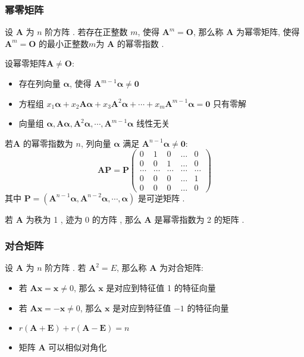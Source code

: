 \documentclass{article}
\begin{document}
				\subsubsection{幂零矩阵}
					设 $\boldsymbol A$ 为 $n$ 阶方阵 . 若存在正整数 $m$, 使得 $\boldsymbol A^{m}=\boldsymbol O$, 那么称 $\boldsymbol A$ 为幂零矩阵, 使得 $\boldsymbol A^{m}=\boldsymbol O$ 的最小正整数$m$为 $\boldsymbol A$ 的幂零指数 .

					设幂零矩阵$\boldsymbol A \neq \boldsymbol O$:
					\begin{itemize}
					\item 存在列向量 $\boldsymbol \alpha$, 使得 $\boldsymbol A^{m-1} \boldsymbol \alpha \neq \mathbf 0$
					\item 方程组 $x_{1} \boldsymbol \alpha+x_{2} \boldsymbol A \boldsymbol \alpha+x_{3} \boldsymbol A^{2} \boldsymbol \alpha+\cdots+x_{m} \boldsymbol A^{m-1} \boldsymbol \alpha=\mathbf 0$ 只有零解
					\item 向量组 $\boldsymbol \alpha, \boldsymbol A \boldsymbol \alpha, \boldsymbol A^{2} \boldsymbol \alpha, \cdots, \boldsymbol A^{m-1} \boldsymbol \alpha$ 线性无关
					\end{itemize}

					若$\boldsymbol A$ 的幂零指数为 $n$, 列向量 $\boldsymbol \alpha$ 满足 $\boldsymbol A^{n-1} \boldsymbol \alpha \neq \mathbf 0$:
					$$
					\boldsymbol A \boldsymbol P=\boldsymbol P\left(\begin{array}{ccccc}
						0 & 1 & 0 & \ldots & 0 \\
						0 & 0 & 1 & \ldots & 0 \\
						\ldots & \ldots & \ldots & \ldots & \ldots \\
						0 & 0 & 0 & \ldots & 1 \\
						0 & 0 & 0 & \ldots & 0
					\end{array}\right)
					$$
					其中 $\boldsymbol P=\left(\boldsymbol A^{n-1} \boldsymbol \alpha, \boldsymbol A^{n-2} \boldsymbol \alpha, \cdots, \boldsymbol \alpha\right)$ 是可逆矩阵 .

					若 $\boldsymbol A$ 为秩为 1 , 迹为 0 的方阵 , 那么 $\boldsymbol A$ 是幂零指数为 2 的矩阵 .
				\subsubsection{对合矩阵}
					设 $\boldsymbol A$ 为 $n$ 阶方阵 . 若 $\boldsymbol A^{2}=E$, 那么称 $\boldsymbol A$ 为对合矩阵:
					\begin{itemize}
						\item 若 $\boldsymbol A \boldsymbol x=\boldsymbol x \neq 0$, 那么 $\boldsymbol x$ 是对应到特征值 1 的特征向量
						\item 若 $\boldsymbol A \boldsymbol x=-\boldsymbol x \neq 0$, 那么 $\boldsymbol x$ 是对应到特征值 $-1$ 的特征向量
						\item $r(\boldsymbol A+\boldsymbol E)+r(\boldsymbol A-\boldsymbol E)=n$
						\item 矩阵 $\boldsymbol A$ 可以相似对角化
					\end{itemize}
\end{document}
